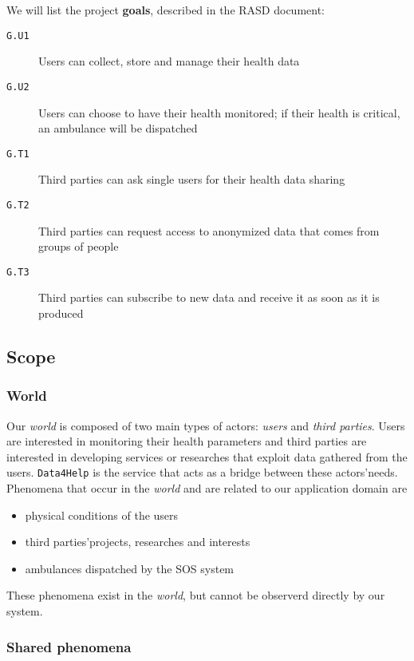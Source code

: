 \documentclass[../DD0.tex]{subfiles}
\begin{document}
    We will list the project \textbf{goals}, described in the RASD document:
    \begin{description}
      \item[\texttt{G.U1}] Users can collect, store and manage their health data
      \item[\texttt{G.U2}] Users can choose to have their health monitored; if their health is critical, an ambulance will be dispatched
      \item[\texttt{G.T1}] Third parties can ask single users for their health data sharing
      \item[\texttt{G.T2}] Third parties can request access to anonymized data that comes from groups of people
      \item[\texttt{G.T3}] Third parties can subscribe to new data and receive it as soon as it is produced
    \end{description}

  \subsection{Scope}
  \label{sec:scope}

    \subsubsection{World}

      Our \textit{world} is composed of two main types of actors: \textit{users} and \textit{third parties}. Users are interested in monitoring their health parameters and third parties are interested in developing services or researches that exploit data gathered from the users. \texttt{Data4Help} is the service that acts as a bridge between these actors'needs. \\
      Phenomena that occur in the \textit{world} and are related to our application domain are
      \begin{itemize}
        \item physical conditions of the users
        \item third parties'projects, researches and interests
        \item ambulances dispatched by the SOS system
      \end{itemize}
      These phenomena exist in the \textit{world}, but cannot be observerd directly by our system.

    \subsubsection{Shared phenomena}
    \label{sec:sharedp}
\end{document}
